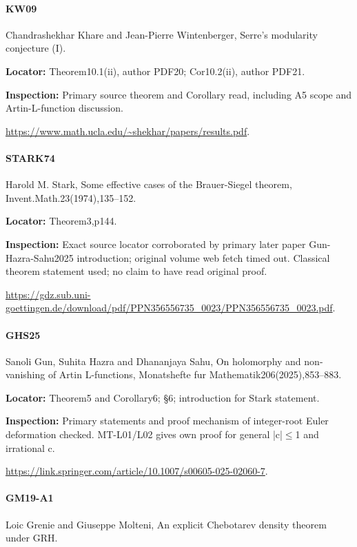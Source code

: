 \documentclass[11pt,a4paper]{article}
\begin{document}
\paragraph{KW09} Chandrashekhar Khare and Jean-Pierre Wintenberger, Serre's modularity conjecture (I).

\textbf{Locator:} Theorem10.\allowbreak{}1(ii), author PDF20; Cor10.\allowbreak{}2(ii), author PDF21.

\textbf{Inspection:} Primary source theorem and Corollary read, including A5 scope and Artin-L-function discussion.\allowbreak{}

\url{https://www.math.ucla.edu/~shekhar/papers/results.pdf}.

\paragraph{STARK74} Harold M.\allowbreak{} Stark, Some effective cases of the Brauer-Siegel theorem, Invent.\allowbreak{}Math.\allowbreak{}23(1974),135–\allowbreak{}152.

\textbf{Locator:} Theorem3,p144.

\textbf{Inspection:} Exact source locator corroborated by primary later paper Gun-Hazra-Sahu2025 introduction; original volume web fetch timed out.\allowbreak{} Classical theorem statement used; no claim to have read original proof.\allowbreak{}

\url{https://gdz.sub.uni-goettingen.de/download/pdf/PPN356556735_0023/PPN356556735_0023.pdf}.

\paragraph{GHS25} Sanoli Gun, Suhita Hazra and Dhananjaya Sahu, On holomorphy and non-vanishing of Artin L-functions, Monatshefte fur Mathematik206(2025),853–\allowbreak{}883.

\textbf{Locator:} Theorem5 and Corollary6; §6; introduction for Stark statement.

\textbf{Inspection:} Primary statements and proof mechanism of integer-root Euler deformation checked.\allowbreak{} MT-L01/\allowbreak{}L02 gives own proof for general |c|\ensuremath{\le}1 and irrational c.\allowbreak{}

\url{https://link.springer.com/article/10.1007/s00605-025-02060-7}.

\paragraph{GM19-A1} Loic Grenie and Giuseppe Molteni, An explicit Chebotarev density theorem under GRH.
\end{document}
